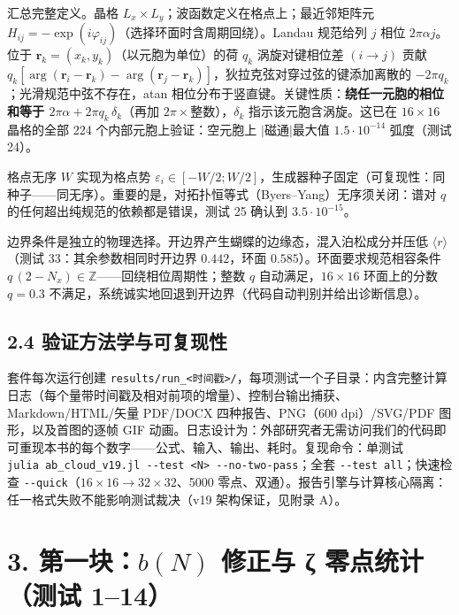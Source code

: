 \documentclass[
]{article}
\begin{document}
汇总完整定义。晶格 \(L_x\times L_y\)；波函数定义在格点上；最近邻矩阵元
\(H_{ij} = -\exp(i\varphi_{ij})\)（选择环面时含周期回绕）。Landau
规范给列 \(j\) 相位 \(2\pi\alpha j\)。位于
\(\mathbf r_k=(x_k,y_k)\)（以元胞为单位）的荷 \(q_k\) 涡旋对键相位差
\((i\to j)\) 贡献
\(q_k[\arg(\mathbf r_i-\mathbf r_k)-\arg(\mathbf r_j-\mathbf r_k)]\)，狄拉克弦对穿过弦的键添加离散的
\(-2\pi q_k\)；光滑规范中弦不存在，atan
相位分布于竖直键。关键性质：\textbf{绕任一元胞的相位和等于
\(2\pi\alpha + 2\pi q_k\,\delta_k\)}（再加
\(2\pi\times\)整数），\(\delta_k\) 指示该元胞含涡旋。这已在
\(16\times16\) 晶格的全部 224 个内部元胞上验证：空元胞上
\(|\)磁通\(|\)最大值 \(1.5\cdot10^{-14}\) 弧度（测试 24）。

格点无序 \(W\) 实现为格点势
\(\varepsilon_i\in[-W/2;W/2]\)，生成器种子固定（可复现性：同种子------同无序）。重要的是，对拓扑恒等式（Byers--Yang）无序须关闭：谱对
\(q\) 的任何超出纯规范的依赖都是错误，测试 25 确认到
\(3.5\cdot10^{-15}\)。

边界条件是独立的物理选择。开边界产生蝴蝶的边缘态，混入泊松成分并压低
\(\langle r\rangle\)（测试 33：其余参数相同时开边界 \(0.442\)，环面
\(0.585\)）。环面要求规范相容条件
\(q\,(2-N_x)\in\mathbb{Z}\)------回绕相位周期性；整数 \(q\)
自动满足，\(16\times16\) 环面上的分数 \(q=0.3\)
不满足，系统诚实地回退到开边界（代码自动判别并给出诊断信息）。

\subsection{2.4
验证方法学与可复现性}\label{ux9a8cux8bc1ux65b9ux6cd5ux5b66ux4e0eux53efux590dux73b0ux6027}

套件每次运行创建
\texttt{results/run\_\textless{}时间戳\textgreater{}/}，每项测试一个子目录：内含完整计算日志（每个量带时间戳及相对前项的增量）、控制台输出捕获、Markdown/HTML/矢量
PDF/DOCX 四种报告、PNG（600 dpi）/SVG/PDF 图形，以及首图的逐帧 GIF
动画。日志设计为：外部研究者无需访问我们的代码即可重现本书的每个数字------公式、输入、输出、耗时。复现命令：单测试
\texttt{julia\ ab\_cloud\_v19.jl\ -\/-test\ \textless{}N\textgreater{}\ -\/-no-two-pass}；全套
\texttt{-\/-test\ all}；快速检查
\texttt{-\/-quick}（\(16\times16\to32\times32\)、5000
零点、双通）。报告引擎与计算核心隔离：任一格式失败不能影响测试裁决（v19
架构保证，见附录 A）。

\section{\texorpdfstring{3. 第一块：\(b(N)\) 修正与 ζ 零点统计（测试
1--14）}{3. 第一块：b(N) 修正与 ζ 零点统计（测试 1--14）}}\label{ux7b2cux4e00ux5757bn-ux4feeux6b63ux4e0e-ux3b6-ux96f6ux70b9ux7edfux8ba1ux6d4bux8bd5-114}
\end{document}
